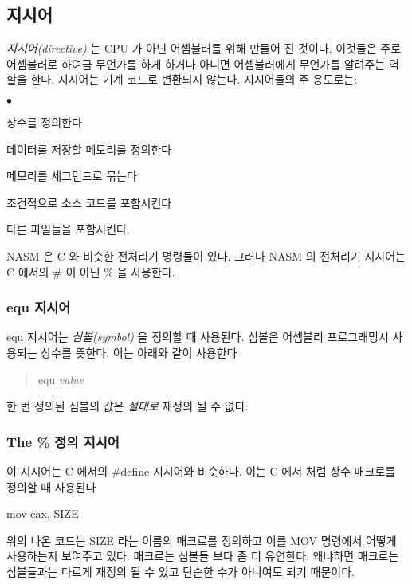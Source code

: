 \subsection{지시어}

\emph{지시어(directive)} 는 CPU 가 아닌 어셈블러를 위해 만들어 진 것이다. 이것들은 주로 어셈블러로 하여금 무언가를 하게 하거나 아니면
어셈블러에게 무언가를 알려주는 역할을 한다. 지시어는 기계 코드로 변환되지 않는다. 지시어들의 주 용도로는:

\begin{list}{$\bullet$}{\setlength{\itemsep}{0pt}}
\item  상수를 정의한다
\item 데이터를 저장할 메모리를 정의한다
\item 메모리를 세그먼드로 묶는다
\item 조건적으로 소스 코드를 포함시킨다
\item 다른 파일들을 포함시킨다.
\end{list}

NASM 은 C 와 비슷한 전처리기 명령들이 있다. 그러나 NASM 의 전처리기 지시어는 C 에서의 \# 이 아닌 \% 을 사용한다. 

\subsubsection{equ 지시어}

{\code equ} 지시어는 \emph{심볼(symbol)} 을 정의할 때 사용된다. 심볼은 어셈블리 프로그래밍시 사용되는 상수를 뜻한다. 이는 아래와 같이 사용한다

\begin{quote}
   equ {\em value}
\end{quote}

한 번 정의된 심볼의 값은 \emph{절대로} 재정의 될 수 없다. 

\subsubsection{The \% 정의 지시어}

이 지시어는 C 에서의 {\code \#define} 지시어와 비슷하다. 이는 C 에서 처럼 상수 매크로를 정의할 때 사용된다
\begin{AsmCodeListing}[frame=none, numbers=none]
      mov    eax, SIZE
\end{AsmCodeListing}

위의 나온 코드는 {\code SIZE} 라는 이름의 매크로를 정의하고 이를 {\code MOV} 명령에서 어떻게 사용하는지 보여주고 있다. 매크로는 심볼들 보다 좀 더 
유연한다. 왜냐하면 매크로는 심볼들과는 다르게 재정의 될 수 있고 단순한 수가 아니여도 되기 때문이다. 

